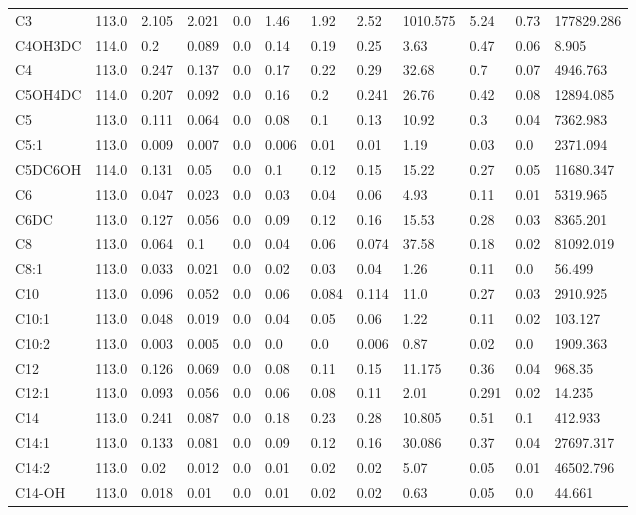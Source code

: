 \begin{tabular}{llllllllllll}
C3 & 113.0 & 2.105 & 2.021 & 0.0 & 1.46 & 1.92 & 2.52 & 1010.575 & 5.24 & 0.73 & 177829.286 \\
C4OH\C3DC & 114.0 & 0.2 & 0.089 & 0.0 & 0.14 & 0.19 & 0.25 & 3.63 & 0.47 & 0.06 & 8.905 \\
C4 & 113.0 & 0.247 & 0.137 & 0.0 & 0.17 & 0.22 & 0.29 & 32.68 & 0.7 & 0.07 & 4946.763 \\
C5OH\C4DC & 114.0 & 0.207 & 0.092 & 0.0 & 0.16 & 0.2 & 0.241 & 26.76 & 0.42 & 0.08 & 12894.085 \\
C5 & 113.0 & 0.111 & 0.064 & 0.0 & 0.08 & 0.1 & 0.13 & 10.92 & 0.3 & 0.04 & 7362.983 \\
C5:1 & 113.0 & 0.009 & 0.007 & 0.0 & 0.006 & 0.01 & 0.01 & 1.19 & 0.03 & 0.0 & 2371.094 \\
C5DC\C6OH & 114.0 & 0.131 & 0.05 & 0.0 & 0.1 & 0.12 & 0.15 & 15.22 & 0.27 & 0.05 & 11680.347 \\
C6 & 113.0 & 0.047 & 0.023 & 0.0 & 0.03 & 0.04 & 0.06 & 4.93 & 0.11 & 0.01 & 5319.965 \\
C6DC & 113.0 & 0.127 & 0.056 & 0.0 & 0.09 & 0.12 & 0.16 & 15.53 & 0.28 & 0.03 & 8365.201 \\
C8 & 113.0 & 0.064 & 0.1 & 0.0 & 0.04 & 0.06 & 0.074 & 37.58 & 0.18 & 0.02 & 81092.019 \\
C8:1 & 113.0 & 0.033 & 0.021 & 0.0 & 0.02 & 0.03 & 0.04 & 1.26 & 0.11 & 0.0 & 56.499 \\
C10 & 113.0 & 0.096 & 0.052 & 0.0 & 0.06 & 0.084 & 0.114 & 11.0 & 0.27 & 0.03 & 2910.925 \\
C10:1 & 113.0 & 0.048 & 0.019 & 0.0 & 0.04 & 0.05 & 0.06 & 1.22 & 0.11 & 0.02 & 103.127 \\
C10:2 & 113.0 & 0.003 & 0.005 & 0.0 & 0.0 & 0.0 & 0.006 & 0.87 & 0.02 & 0.0 & 1909.363 \\
C12 & 113.0 & 0.126 & 0.069 & 0.0 & 0.08 & 0.11 & 0.15 & 11.175 & 0.36 & 0.04 & 968.35 \\
C12:1 & 113.0 & 0.093 & 0.056 & 0.0 & 0.06 & 0.08 & 0.11 & 2.01 & 0.291 & 0.02 & 14.235 \\
C14 & 113.0 & 0.241 & 0.087 & 0.0 & 0.18 & 0.23 & 0.28 & 10.805 & 0.51 & 0.1 & 412.933 \\
C14:1 & 113.0 & 0.133 & 0.081 & 0.0 & 0.09 & 0.12 & 0.16 & 30.086 & 0.37 & 0.04 & 27697.317 \\
C14:2 & 113.0 & 0.02 & 0.012 & 0.0 & 0.01 & 0.02 & 0.02 & 5.07 & 0.05 & 0.01 & 46502.796 \\
C14-OH & 113.0 & 0.018 & 0.01 & 0.0 & 0.01 & 0.02 & 0.02 & 0.63 & 0.05 & 0.0 & 44.661 \\

\end{tabular}
